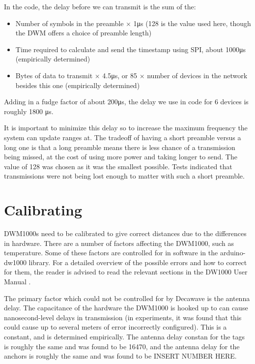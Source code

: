 In the code, the delay before we can transmit is the sum of the:
\begin{itemize}
	\item Number of symbols in the preamble $\times$ 1\si{\micro\second} (128 is the value used here, though the DWM offers a choice of preamble length)
	\item Time required to calculate and send the timestamp using SPI, about 1000\si{\micro\second} (empirically determined)
	\item Bytes of data to transmit $\times$ 4.5\si{\micro\second}, or 85 $\times$ number of devices in the network besides this one (empirically determined)
\end{itemize}

Adding in a fudge factor of about 200\si{\micro\second}, the delay we use in code for 6 devices is roughly 1800 \si{\micro\second}.

It is important to minimize this delay so to increase the maximum frequency the system can update ranges at. The tradeoff of having a short preamble versus a long one is that a long preamble means there is less chance of a transmission being missed, at the cost of using more power and taking longer to send. The value of 128 was chosen as it was the smallest possible. Tests indicated that transmissions were not being lost enough to matter with such a short preamble.

\section{Calibrating}
DWM1000s need to be calibrated to give correct distances due to the differences in hardware. There are a number of factors affecting the DWM1000, such as temperature. Some of these factors are controlled for in software in the arduino-dw1000 library. For a detailed overview of the possible errors and how to correct for them, the reader is advised to read the relevant sections in the DW1000 User Manual \cite{DW1000UserManual}.

The primary factor which could not be controlled for by Decawave is the antenna delay. The capacitance of the hardware the DWM1000 is hooked up to can cause nanosecond-level delays in transmission (in experiments, it was found that this could cause up to several meters of error incorrectly configured). This is a constant, and is determined empirically. The antenna delay constan for the tags is roughly the same and was found to be 16470, and the antenna delay for the anchors is roughly the same and was found to be INSERT NUMBER HERE.

